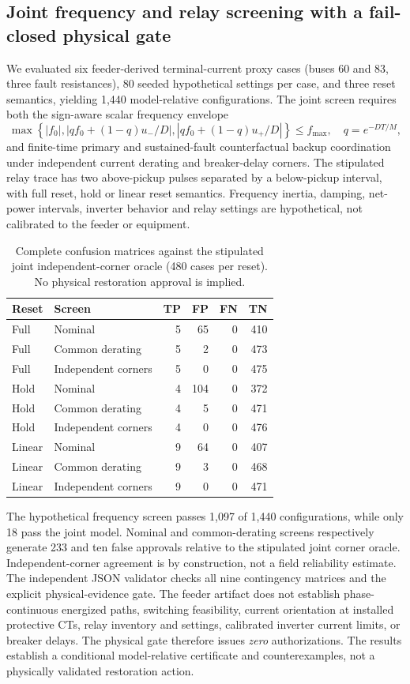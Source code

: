 \subsection{Joint frequency and relay screening with a fail-closed physical gate}
\label{sec:p10-joint}
We evaluated six feeder-derived terminal-current proxy cases (buses 60 and 83, three fault resistances), 80 seeded hypothetical settings per case, and three reset semantics, yielding 1,440 model-relative configurations. The joint screen requires both the sign-aware scalar frequency envelope
\[
\max\!\left\{|f_0|,\left|qf_0+(1-q)u_-/D\right|,
\left|qf_0+(1-q)u_+/D\right|\right\}\le f_{\max},
\quad q=e^{-DT/M},
\]
and finite-time primary and sustained-fault counterfactual backup coordination under independent current derating and breaker-delay corners. The stipulated relay trace has two above-pickup pulses separated by a below-pickup interval, with full reset, hold or linear reset semantics. Frequency inertia, damping, net-power intervals, inverter behavior and relay settings are hypothetical, not calibrated to the feeder or equipment.
\begin{table}[H]\centering\small
\caption{Complete confusion matrices against the stipulated joint independent-corner oracle (480 cases per reset). No physical restoration approval is implied.}\label{tab:p10-joint}
\begin{tabular}{llrrrr}\toprule
Reset & Screen & TP & FP & FN & TN\\\midrule
Full & Nominal & 5 & 65 & 0 & 410\\
Full & Common derating & 5 & 2 & 0 & 473\\
Full & Independent corners & 5 & 0 & 0 & 475\\
Hold & Nominal & 4 & 104 & 0 & 372\\
Hold & Common derating & 4 & 5 & 0 & 471\\
Hold & Independent corners & 4 & 0 & 0 & 476\\
Linear & Nominal & 9 & 64 & 0 & 407\\
Linear & Common derating & 9 & 3 & 0 & 468\\
Linear & Independent corners & 9 & 0 & 0 & 471\\\bottomrule
\end{tabular}
\end{table}
The hypothetical frequency screen passes 1,097 of 1,440 configurations, while only 18 pass the joint model. Nominal and common-derating screens respectively generate 233 and ten false approvals relative to the stipulated joint corner oracle. Independent-corner agreement is by construction, not a field reliability estimate. The independent JSON validator checks all nine contingency matrices and the explicit physical-evidence gate.
The feeder artifact does not establish phase-continuous energized paths, switching feasibility, current orientation at installed protective CTs, relay inventory and settings, calibrated inverter current limits, or breaker delays. The physical gate therefore issues \emph{zero} authorizations. The results establish a conditional model-relative certificate and counterexamples, not a physically validated restoration action.

